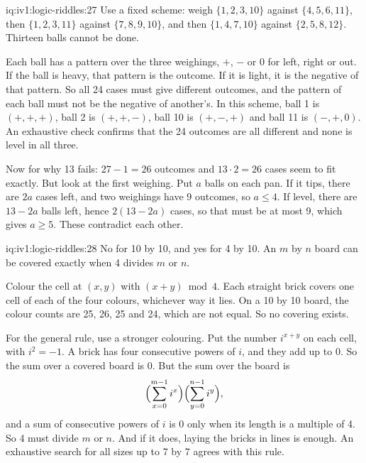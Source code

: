 \begin{solution}{iq:iv1:logic-riddles:27}
Use a fixed scheme: weigh $\{1, 2, 3, 10\}$ against $\{4, 5, 6, 11\}$, then $\{1, 2, 3, 11\}$ against $\{7, 8, 9, 10\}$, and then $\{1, 4, 7, 10\}$ against $\{2, 5, 8, 12\}$. Thirteen balls cannot be done.

Each ball has a pattern over the three weighings, $+$, $-$ or $0$ for left, right or out. If the ball is heavy, that pattern is the outcome. If it is light, it is the negative of that pattern. So all 24 cases must give different outcomes, and the pattern of each ball must not be the negative of another's. In this scheme, ball 1 is $(+, +, +)$, ball 2 is $(+, +, -)$, ball 10 is $(+, -, +)$ and ball 11 is $(-, +, 0)$. An exhaustive check confirms that the 24 outcomes are all different and none is level in all three.

Now for why 13 fails: $27 - 1 = 26$ outcomes and $13 \cdot 2 = 26$ cases seem to fit exactly. But look at the first weighing. Put $a$ balls on each pan. If it tips, there are $2a$ cases left, and two weighings have 9 outcomes, so $a \le 4$. If level, there are $13 - 2a$ balls left, hence $2(13 - 2a)$ cases, so that must be at most 9, which gives $a \ge 5$. These contradict each other.

\end{solution}

\begin{solution}{iq:iv1:logic-riddles:28}
No for 10 by 10, and yes for 4 by 10. An $m$ by $n$ board can be covered exactly when 4 divides $m$ or $n$.

Colour the cell at $(x, y)$ with $(x + y) \bmod 4$. Each straight brick covers one cell of each of the four colours, whichever way it lies. On a 10 by 10 board, the colour counts are 25, 26, 25 and 24, which are not equal. So no covering exists.

For the general rule, use a stronger colouring. Put the number $i^{x + y}$ on each cell, with $i^2 = -1$. A brick has four consecutive powers of $i$, and they add up to 0. So the sum over a covered board is 0. But the sum over the board is
\[
\Bigl(\sum_{x = 0}^{m - 1} i^x\Bigr)\Bigl(\sum_{y = 0}^{n - 1} i^y\Bigr),
\]
and a sum of consecutive powers of $i$ is 0 only when its length is a multiple of 4. So 4 must divide $m$ or $n$. And if it does, laying the bricks in lines is enough. An exhaustive search for all sizes up to 7 by 7 agrees with this rule.

\end{solution}

